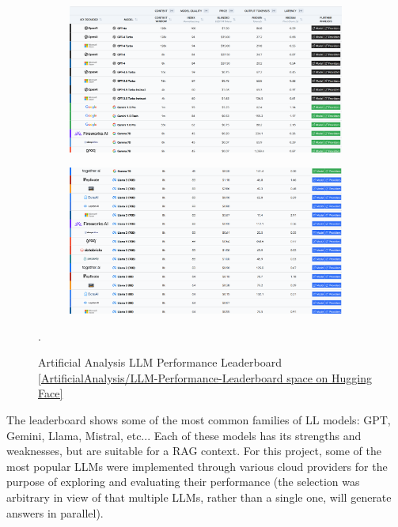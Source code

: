 \begin{figure}
    \begin{subfigure}{\textwidth}
        \centering
        \includegraphics[width=\linewidth]{./figures/LLM-Perf-P1.png}
    \end{subfigure}
    \begin{subfigure}{\textwidth}
        \centering
        \includegraphics[width=\linewidth]{./figures/LLM-Perf-P2.png}
    \end{subfigure}
    \caption{Artificial Analysis LLM Performance Leaderboard \href{https://huggingface.co/spaces/ArtificialAnalysis/LLM-Performance-Leaderboard}{[ArtificialAnalysis/LLM-Performance-Leaderboard space on Hugging Face]}}.
\end{figure}\newpage
The leaderboard shows some of the most common families of LL models: GPT, Gemini, Llama, Mistral, etc...
Each of these models has its strengths and weaknesses, but are suitable for a RAG context. For this project, some of the most popular LLMs were implemented through various cloud providers for the purpose of exploring and evaluating their performance (the selection was arbitrary in view of that multiple LLMs, rather than a single one, will generate answers in parallel).

